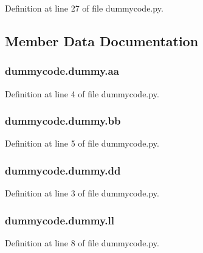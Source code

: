Definition at line 27 of file dummycode.\-py.



\subsection{Member Data Documentation}
\subsubsection[{aa}]{\setlength{\rightskip}{0pt plus 5cm}dummycode.\-dummy.\-aa}\label{classdummycode_1_1dummy_ade8c2a23728fea407400de565af9d924}


Definition at line 4 of file dummycode.\-py.

\subsubsection[{bb}]{\setlength{\rightskip}{0pt plus 5cm}dummycode.\-dummy.\-bb}\label{classdummycode_1_1dummy_a8fc4a473d7dc65b38abc8ca2bbf56d0c}


Definition at line 5 of file dummycode.\-py.

\subsubsection[{dd}]{\setlength{\rightskip}{0pt plus 5cm}dummycode.\-dummy.\-dd}\label{classdummycode_1_1dummy_af2feb69e325549343d505d0f5afaacd0}


Definition at line 3 of file dummycode.\-py.

\subsubsection[{ll}]{\setlength{\rightskip}{0pt plus 5cm}dummycode.\-dummy.\-ll}\label{classdummycode_1_1dummy_aff4159330a4c573597b401b5503818d7}


Definition at line 8 of file dummycode.\-py.

